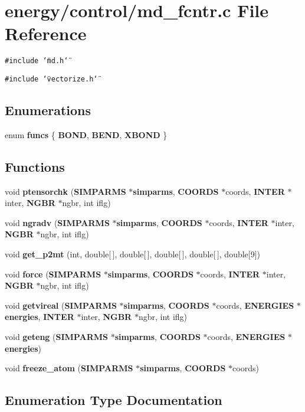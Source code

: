 \section{energy/control/md\_\-fcntr.c File Reference}
\label{md__fcntr_8c}
{\tt \#include \char`\"{}md.h\char`\"{}}\par
{\tt \#include \char`\"{}vectorize.h\char`\"{}}\par
\subsection*{Enumerations}
\begin{CompactItemize}
\item 
enum {\bf funcs} \{ {\bf BOND}, 
{\bf BEND}, 
{\bf XBOND}
 \}
\end{CompactItemize}
\subsection*{Functions}
\begin{CompactItemize}
\item 
void {\bf ptensorchk} ({\bf SIMPARMS} $\ast${\bf simparms}, {\bf COORDS} $\ast$coords, {\bf INTER} $\ast$inter, {\bf NGBR} $\ast$ngbr, int iflg)
\item 
void {\bf ngradv} ({\bf SIMPARMS} $\ast${\bf simparms}, {\bf COORDS} $\ast$coords, {\bf INTER} $\ast$inter, {\bf NGBR} $\ast$ngbr, int iflg)
\item 
void {\bf get\_\-p2mt} (int, double[$\,$], double[$\,$], double[$\,$], double[$\,$], double[9])
\item 
void {\bf force} ({\bf SIMPARMS} $\ast${\bf simparms}, {\bf COORDS} $\ast$coords, {\bf INTER} $\ast$inter, {\bf NGBR} $\ast$ngbr, int iflg)
\item 
void {\bf getvireal} ({\bf SIMPARMS} $\ast${\bf simparms}, {\bf COORDS} $\ast$coords, {\bf ENERGIES} $\ast${\bf energies}, {\bf INTER} $\ast$inter, {\bf NGBR} $\ast$ngbr, int iflg)
\item 
void {\bf geteng} ({\bf SIMPARMS} $\ast${\bf simparms}, {\bf COORDS} $\ast$coords, {\bf ENERGIES} $\ast${\bf energies})
\item 
void {\bf freeze\_\-atom} ({\bf SIMPARMS} $\ast${\bf simparms}, {\bf COORDS} $\ast$coords)
\end{CompactItemize}


\subsection{Enumeration Type Documentation}
